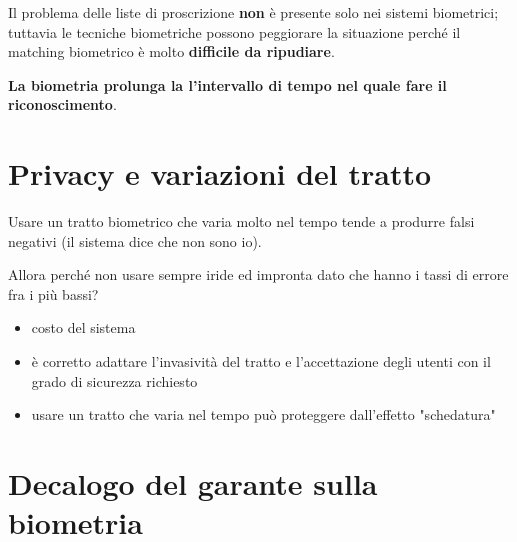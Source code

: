 \documentclass{report}
\begin{document}
Il problema delle liste di proscrizione \textbf{non} è presente solo nei sistemi biometrici; tuttavia le tecniche biometriche possono peggiorare la situazione perché il matching biometrico è molto \textbf{difficile da ripudiare}.

\textbf{La biometria prolunga la l'intervallo di tempo nel quale fare il riconoscimento}.

\section{Privacy e variazioni del tratto}

Usare un tratto biometrico che varia molto nel tempo tende a produrre falsi negativi (il sistema dice che non sono io).

Allora perché non usare sempre iride ed impronta dato che hanno i tassi di errore fra i più bassi?
\begin{itemize}
    \item costo del sistema
    \item è corretto adattare l'invasività del tratto e l'accettazione degli utenti con il grado di sicurezza richiesto
    \item usare un tratto che varia nel tempo può proteggere dall'effetto "schedatura"
\end{itemize}

\section{Decalogo del garante sulla biometria}
\end{document}
